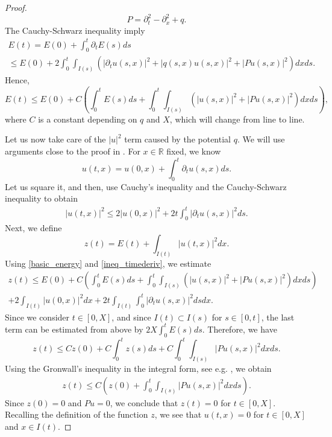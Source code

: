 \documentclass[12pt,oneside,final]{amsart}
\begin{document}
\begin{proof}
\begin{equation*}
			P= \partial_{t}^2 - \partial_x^2 + q.
		\end{equation*}
		The Cauchy-Schwarz inequality imply
		\begin{multline*}
			E(t) = E(0) + \int_{0}^{t} \partial_t E(s) ds\\
			\leq E(0) + 2\int_0^t \int_{I(s)}\left( |\partial_t u(s,x)|^2 +|q(s,x) u(s,x)|^2 + |P u(s,x)|^2 \right)dx ds.
		\end{multline*}
		Hence,
		\begin{equation}\label{basic_energy}
			E(t) \leq E(0) + C \left( \int_0^t E(s)ds + \int_0^t \int_{I(s)} \left(|u(s,x)|^2 + |Pu(s,x)|^2\right)dxds\right),
		\end{equation}
		where $C$ is a constant depending on $q$ and $X$, which will change from line to line. 
		
		Let us now take care of the $|u|^2$ term caused by the potential $q$. We will use arguments close to the proof in \cite[Section 4.2]{Ladyzhenskaya1985}.
		For $x\in \mathbb{R}$ fixed, we know
		\begin{equation*}
			u(t,x) = u(0,x) + \int_{0}^{t} \partial_{t}u(s,x) ds.
		\end{equation*}
		Let us square it, and then, use Cauchy's inequality and the Cauchy-Schwarz inequality to obtain
		\begin{align}\label{ineq_timederiv}
			|u(t,x)|^2 \le 2 |u(0,x)|^2 + 2 t \int_0^t |\partial_t u(s,x)|^2 ds.
		\end{align}
		Next, we define
		\begin{equation*}
			z(t) = E(t) +  \int_{I(t)} |u(t,x)|^2 dx.
		\end{equation*}
		Using \eqref{basic_energy} and \eqref{ineq_timederiv}, we estimate
		\begin{multline*}
			z(t)  \leq  E(0) + C \left( \int_0^t E(s)ds + \int_0^t \int_{I(s)} \left( | u(s,x)|^2 + |P u(s,x)|^2 \right)dxds\right)\\
			+ 2 \int_{I(t)} |u(0,x)|^2 dx + 2 t\int_{I(t)} \int_0^t |\partial_t u(s,x)|^2 ds dx.
		\end{multline*}
		Since we consider $t\in [0, X]$, and since $I(t) \subset I(s)$ for $s \in [0,t]$, the last term can be estimated from above by $2X \int_{0}^{t} E(s) ds$. Therefore, we have
		\begin{equation*}
			z(t)  \leq  Cz(0) + C \int_{0}^{t} z(s) ds + C\int_0^t \int_{I(s)} |P u(s,x)|^2dxds.
		\end{equation*}
Using the Gronwall's inequality in the integral form, see e.g. \cite[Appendix B.2.k]{Evans1998}, we obtain
	\begin{align}\label{finite_speed_1d}
z(t) \le C \left(z(0) + \int_0^t \int_{I(s)} |P u(s,x)|^2dxds\right).
	\end{align}
		Since $z(0) = 0$ and $Pu = 0$, we conclude that $z(t) = 0$ for $t\in [0,X]$. Recalling the definition of the function $z$, we see that $u(t,x) = 0$ for $t\in [0,X]$ and $x\in I(t)$.
\end{proof}
\end{document}
